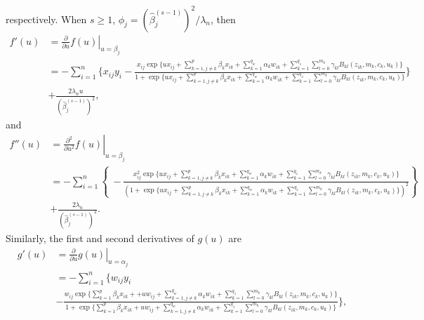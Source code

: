 \documentclass[11pt]{article}
\begin{document}
respectively. When $s \geq 1$, $\phi_j = (\widehat{\beta}^{(s-1)}_j)^2/\lambda_n$, then
\begin{equation*}
\begin{split}
f'(u) & = \left. \frac{\partial}{\partial u} f(u) \right\vert_{u=\beta_j} \\ &= - \sum^n_{i=1} \bigg\{x_{ij}y_i - \frac{x_{ij} \exp\{u x_{ij} + \sum^p_{k=1, j \neq k} \beta_k x_{ik} + \sum^{q_w}_{k=1} \alpha_k w_{ik} + \sum^{q_z}_{k=1} \sum^{m_k}_{l=0} \gamma_{kl} B_{kl}(z_{ik},m_k,c_k,u_k) \}}{1 + \exp\{u x_{ij} + \sum^p_{k=1, j \neq k} \beta_k x_{ik} + \sum^{q_w}_{k=1} \alpha_k w_{ik} +\sum^{q_z}_{k=1} \sum^{m_k}_{l=0} \gamma_{kl} B_{kl}(z_{ik},m_k,c_k,u_k) \} }\bigg\} \\
& + \frac{2\lambda_n u}{(\widehat{\beta}^{(s-1)}_j)^2},
\end{split}
\end{equation*}
and
\begin{equation*}
\begin{split}
f''(u) & = \left. \frac{\partial^2}{\partial u^2} f(u) \right\vert_{u=\beta_j} \\  &= - \sum^n_{i=1} \left\{\
- \frac{x^2_{ij} \exp\{u x_{ij} + \sum^p_{k=1, j \neq k} \beta_k x_{ik} + \sum^{q_w}_{k=1} \alpha_k w_{ik} + \sum^{q_z}_{k=1} \sum^{m_k}_{l=0} \gamma_{kl} B_{kl}(z_{ik},m_k,c_k,u_k) \}}{(1 + \exp\{u x_{ij} + \sum^p_{k=1, j \neq k} \beta_k x_{ik} + \sum^{q_w}_{k=1} \alpha_k w_{ik} + \sum^{q_z}_{k=1} \sum^{m_k}_{l=0} \gamma_{kl} B_{kl}(z_{ik},m_k,c_k,u_k) \})^2} \right\} \\
& + \frac{2\lambda_n}{(\widehat{\beta}^{(s-1)}_j)^2}.
\end{split}
\end{equation*}
Similarly, the first and second derivatives of $g(u)$ are
\begin{equation*}
\begin{split}
g'(u) & = \left. \frac{\partial}{\partial u} g(u) \right\vert_{u=\alpha_j} \\ & = - \sum^n_{i=1} \bigg\{w_{ij} y_i \\
&- \frac{w_{ij} \exp\{ \sum^p_{k=1} \beta_k x_{ik} + + u w_{ij} + \sum^{q_w}_{k=1, j \neq k} \alpha_k w_{ik} + \sum^{q_z}_{k=1} \sum^{m_k}_{l=0} \gamma_{kl} B_{kl}(z_{ik},m_k,c_k,u_k) \} }{1+\exp\{ \sum^p_{k=1} \beta_k x_{ik} + u w_{ij} + \sum^{q_w}_{k=1, j \neq k} \alpha_k w_{ik} +  \sum^{q_z}_{k=1} \sum^{m_k}_{l=0} \gamma_{kl} B_{kl}(z_{ik},m_k,c_k,u_k) \}} \bigg\},
\end{split}
\end{equation*}
\end{document}
